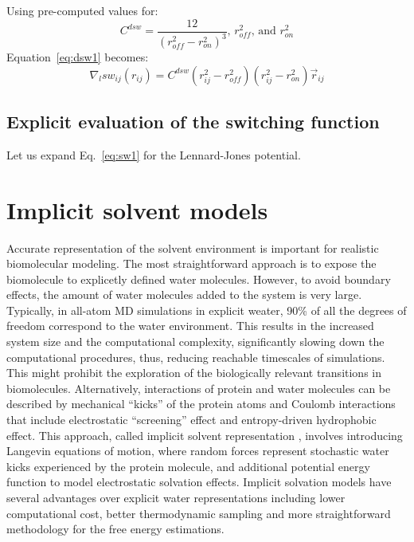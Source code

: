 \documentclass[11pt]{book}
\begin{document}
Using pre-computed values for:
\begin{equation}\label{eq:dsw2}
C^{dsw} = \frac{12}{\left(r_{off}^{2}-r_{on}^{2}\right)^{3}}\text{,  } r_{off}^{2} \text{, and  } r_{on}^{2}
\end{equation}
Equation~\ref{eq:dsw1} becomes:
\begin{equation}\label{eq:dsw3}
\nabla_{l}sw_{ij}(r_{ij})=C^{dsw}\left(r_{ij}^{2}-r_{off}^{2}\right)\left(r_{ij}^2-r_{on}^{2}\right)\vec{r}_{ij}
\end{equation}


\subsection{Explicit evaluation of the switching function}
Let us expand Eq.~\ref{eq:sw1} for the Lennard-Jones potential.



\section{Implicit solvent models}

Accurate representation of the solvent environment is important for realistic biomolecular modeling. The most straightforward approach is to expose the biomolecule to explicetly defined water molecules. However, to avoid boundary effects, the amount of water molecules added to the system is very large. Typically, in all-atom MD simulations in explicit weater, 90\% of all the degrees of freedom correspond to the water environment. This results in the increased system size and the computational complexity, significantly slowing down the computational procedures, thus, reducing reachable timescales of simulations. This might prohibit the exploration of the biologically relevant transitions in biomolecules. Alternatively, interactions of protein and water molecules can be described by mechanical ``kicks'' of the protein atoms and Coulomb interactions that include electrostatic ``screening'' effect and entropy-driven hydrophobic effect. This approach, called implicit solvent representation \cite{ChenCOSB08,Charmm09}, involves introducing Langevin equations of motion, where random forces represent stochastic water kicks experienced by the protein molecule, and additional potential energy function to model electrostatic solvation effects. Implicit solvation models have several advantages over explicit water representations including lower computational cost, better thermodynamic sampling and more straightforward methodology for the free energy estimations.
\end{document}
